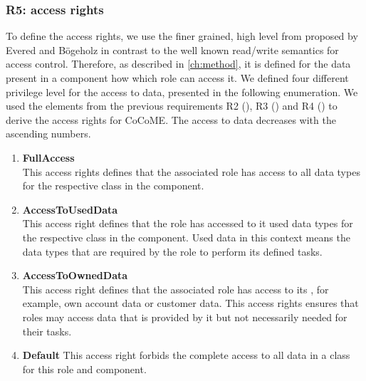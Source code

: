 \subsubsection{R5: access rights}
To define the access rights, we use the finer grained, high level from proposed by Evered and Bögeholz \cite{CaseStudyAndAccessrigths} in contrast to the well known read/write semantics for access control. %
Therefore, as described in \autoref{ch:method}, it is defined for the data present in a component how which role can access it. We defined four different privilege level for the access to data, presented in the following enumeration. We used the  elements from the previous requirements R2 (), R3 () and R4 () to derive the access rights for CoCoME. The access to data decreases with the ascending numbers.
\begin{enumerate}
\item \textbf{FullAccess}\\ This access rights defines that the associated role has access to all data types for the respective class in the component.
\item \textbf{AccessToUsedData}\\ This access right defines that the role has accessed to it used data types for the respective class in the component. Used data in this context means the data types that are required by the role to perform its defined tasks.
\item \textbf{AccessToOwnedData}\\ This access right defines that the associated role has access to its , for example, own account data or customer data. This access rights ensures that roles may access data that is provided by it but not necessarily needed for their tasks.
\item \textbf{Default} This access right forbids the complete access to all data in a class for this role and component.
\end{enumerate}

